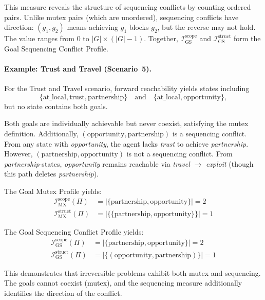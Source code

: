 This measure reveals the structure of sequencing conflicts by counting ordered pairs. Unlike mutex pairs (which are unordered), sequencing conflicts have direction: $(g_1, g_2)$ means achieving $g_1$ blocks $g_2$, but the reverse may not hold. The value ranges from $0$ to $|G| \times (|G|-1)$. Together, $\mathcal{I}^{\text{scope}}_{\text{GS}}$ and $\mathcal{I}^{\text{struct}}_{\text{GS}}$ form the Goal Sequencing Conflict Profile.

\paragraph{Example: Trust and Travel (Scenario~5).} For the Trust and Travel scenario, forward reachability yields states including
\begin{equation*}
    \{\text{at\_local}, \text{trust}, \text{partnership}\} \quad \text{and} \quad \{\text{at\_local}, \text{opportunity}\},
\end{equation*}
but no state contains both goals.

Both goals are individually achievable but never coexist, satisfying the mutex definition. Additionally, $(\text{opportunity}, \text{partnership})$ is a sequencing conflict. From any state with \textit{opportunity}, the agent lacks \textit{trust} to achieve \textit{partnership}. However, $(\text{partnership}, \text{opportunity})$ is not a sequencing conflict. From \textit{partnership}-states, \textit{opportunity} remains reachable via \textit{travel} $\rightarrow$ \textit{exploit} (though this path deletes \textit{partnership}).

The Goal Mutex Profile yields:
\begin{align*}
    \mathcal{I}^{\text{scope}}_{\text{MX}}(\Pi)  & = |\{\text{partnership}, \text{opportunity}\}| = 2     \\
    \mathcal{I}^{\text{struct}}_{\text{MX}}(\Pi) & = |\{\{\text{partnership}, \text{opportunity}\}\}| = 1
\end{align*}

The Goal Sequencing Conflict Profile yields:
\begin{align*}
    \mathcal{I}^{\text{scope}}_{\text{GS}}(\Pi)  & = |\{\text{partnership}, \text{opportunity}\}| = 2   \\
    \mathcal{I}^{\text{struct}}_{\text{GS}}(\Pi) & = |\{(\text{opportunity}, \text{partnership})\}| = 1
\end{align*}

This demonstrates that irreversible problems exhibit both mutex and sequencing. The goals cannot coexist (mutex), and the sequencing measure additionally identifies the direction of the conflict.

